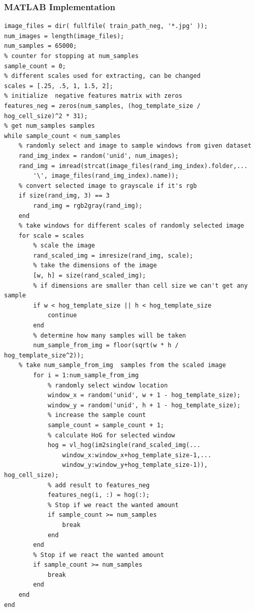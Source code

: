 \documentclass{article}
\begin{document}
\subsubsection{MATLAB Implementation}
\begin{lstlisting}[caption={Related part of the get\_training\_features function for getting HoG values of non-face images.},captionpos=b]
image_files = dir( fullfile( train_path_neg, '*.jpg' ));
num_images = length(image_files);
num_samples = 65000;
% counter for stopping at num_samples
sample_count = 0;
% different scales used for extracting, can be changed
scales = [.25, .5, 1, 1.5, 2];
% initialize  negative features matrix with zeros
features_neg = zeros(num_samples, (hog_template_size / hog_cell_size)^2 * 31);
% get num_samples samples    
while sample_count < num_samples
    % randomly select and image to sample windows from given dataset
    rand_img_index = random('unid', num_images);
    rand_img = imread(strcat(image_files(rand_img_index).folder,...
        '\', image_files(rand_img_index).name));
    % convert selected image to grayscale if it's rgb
    if size(rand_img, 3) == 3
        rand_img = rgb2gray(rand_img);
    end
    % take windows for different scales of randomly selected image
    for scale = scales
        % scale the image
        rand_scaled_img = imresize(rand_img, scale);
        % take the dimensions of the image
        [w, h] = size(rand_scaled_img);    
        % if dimensions are smaller than cell size we can't get any sample 
        if w < hog_template_size || h < hog_template_size
            continue
        end
        % determine how many samples will be taken
        num_sample_from_img = floor(sqrt(w * h / hog_template_size^2));
	% take num_sample_from_img  samples from the scaled image
        for i = 1:num_sample_from_img
            % randomly select window location 
            window_x = random('unid', w + 1 - hog_template_size);
            window_y = random('unid', h + 1 - hog_template_size);
            % increase the sample count
            sample_count = sample_count + 1;
            % calculate HoG for selected window
            hog = vl_hog(im2single(rand_scaled_img(...
                window_x:window_x+hog_template_size-1,...
                window_y:window_y+hog_template_size-1)), hog_cell_size);
            % add result to features_neg
            features_neg(i, :) = hog(:);
            % Stop if we react the wanted amount
            if sample_count >= num_samples
                break
            end
        end
        % Stop if we react the wanted amount
        if sample_count >= num_samples
            break
        end
    end
end
\end{lstlisting}
\end{document}
